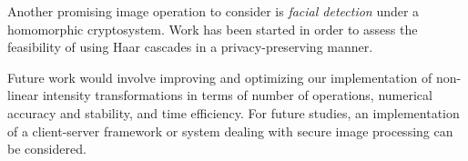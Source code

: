 Another promising image operation to consider is \textit{facial detection} under a homomorphic cryptosystem. Work has been started in order to assess the feasibility of using Haar cascades in a privacy-preserving manner.

Future work would involve improving and optimizing our implementation of non-linear intensity transformations in terms of number of operations, numerical accuracy and stability, and time efficiency.
For future studies, an implementation of a client-server framework or system dealing with secure image processing can be considered.
